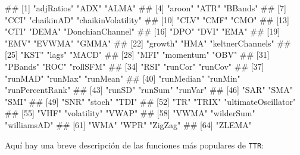\documentclass[
]{book}
\newenvironment{Shaded}{\begin{snugshade}}{\end{snugshade}}
\newcommand{\FunctionTok}[1]{\textcolor[rgb]{0.13,0.29,0.53}{\textbf{#1}}}
\newcommand{\NormalTok}[1]{#1}
\newcommand{\SpecialCharTok}[1]{\textcolor[rgb]{0.81,0.36,0.00}{\textbf{#1}}}
\begin{document}
\begin{Shaded}
\end{Shaded}

\begin{Shaded}
\begin{Highlighting}[]
\NormalTok{\#\#  [1] "adjRatios"          "ADX"                "ALMA"              }
\NormalTok{\#\#  [4] "aroon"              "ATR"                "BBands"            }
\NormalTok{\#\#  [7] "CCI"                "chaikinAD"          "chaikinVolatility" }
\NormalTok{\#\# [10] "CLV"                "CMF"                "CMO"               }
\NormalTok{\#\# [13] "CTI"                "DEMA"               "DonchianChannel"   }
\NormalTok{\#\# [16] "DPO"                "DVI"                "EMA"               }
\NormalTok{\#\# [19] "EMV"                "EVWMA"              "GMMA"              }
\NormalTok{\#\# [22] "growth"             "HMA"                "keltnerChannels"   }
\NormalTok{\#\# [25] "KST"                "lags"               "MACD"              }
\NormalTok{\#\# [28] "MFI"                "momentum"           "OBV"               }
\NormalTok{\#\# [31] "PBands"             "ROC"                "rollSFM"           }
\NormalTok{\#\# [34] "RSI"                "runCor"             "runCov"            }
\NormalTok{\#\# [37] "runMAD"             "runMax"             "runMean"           }
\NormalTok{\#\# [40] "runMedian"          "runMin"             "runPercentRank"    }
\NormalTok{\#\# [43] "runSD"              "runSum"             "runVar"            }
\NormalTok{\#\# [46] "SAR"                "SMA"                "SMI"               }
\NormalTok{\#\# [49] "SNR"                "stoch"              "TDI"               }
\NormalTok{\#\# [52] "TR"                 "TRIX"               "ultimateOscillator"}
\NormalTok{\#\# [55] "VHF"                "volatility"         "VWAP"              }
\NormalTok{\#\# [58] "VWMA"               "wilderSum"          "williamsAD"        }
\NormalTok{\#\# [61] "WMA"                "WPR"                "ZigZag"            }
\NormalTok{\#\# [64] "ZLEMA"}
\end{Highlighting}
\end{Shaded}

Aquí hay una breve descripción de las funciones más populares de \texttt{TTR}:
\end{document}
